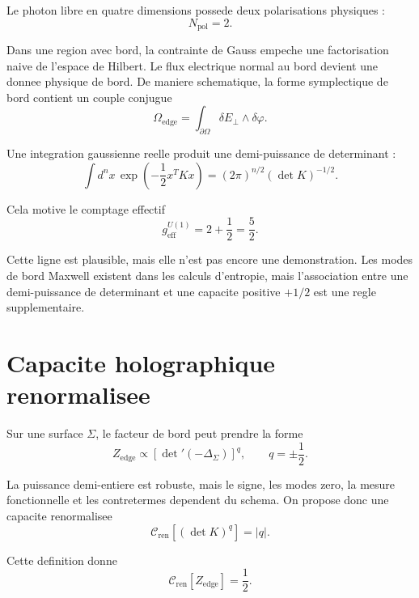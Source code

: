 \documentclass[11pt,a4paper]{article}
\newcommand{\geff}{g_{\mathrm{eff}}^{U(1)}}
\newcommand{\Cren}{\mathcal C_{\mathrm{ren}}}
\begin{document}
Le photon libre en quatre dimensions possede deux polarisations physiques :
\begin{equation}
N_{\mathrm{pol}}=2.
\end{equation}

Dans une region avec bord, la contrainte de Gauss empeche une factorisation
naive de l'espace de Hilbert. Le flux electrique normal au bord devient une
donnee physique de bord. De maniere schematique, la forme symplectique de bord
contient un couple conjugue
\begin{equation}
\Omega_{\mathrm{edge}}
=\int_{\partial\Omega}\delta E_\perp\wedge\delta\varphi.
\end{equation}

Une integration gaussienne reelle produit une demi-puissance de determinant :
\begin{equation}
\int d^n x\,\exp\left(-\frac12x^TKx\right)
=(2\pi)^{n/2}(\det K)^{-1/2}.
\end{equation}

Cela motive le comptage effectif
\begin{equation}
\boxed{\geff=2+\frac12=\frac52.}
\label{eq:2_plus_half}
\end{equation}

Cette ligne est plausible, mais elle n'est pas encore une demonstration. Les
modes de bord Maxwell existent dans les calculs d'entropie, mais l'association
entre une demi-puissance de determinant et une capacite positive \(+1/2\) est
une regle supplementaire.

\section{Capacite holographique renormalisee}

Sur une surface \(\Sigma\), le facteur de bord peut prendre la forme
\begin{equation}
Z_{\mathrm{edge}}\propto
\left[\det{}'(-\Delta_\Sigma)\right]^{q},
\qquad q=\pm\frac12.
\end{equation}

La puissance demi-entiere est robuste, mais le signe, les modes zero, la mesure
fonctionnelle et les contretermes dependent du schema. On propose donc une
capacite renormalisee
\begin{equation}
\boxed{\Cren[(\det K)^q]=|q|.}
\label{eq:Cren}
\end{equation}

Cette definition donne
\begin{equation}
\Cren[Z_{\mathrm{edge}}]=\frac12.
\end{equation}
\end{document}
